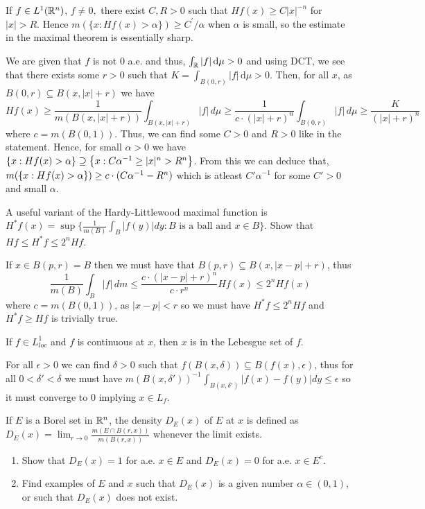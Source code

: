 \documentclass[12pt,a4paper]{article}
\begin{document}
\begin{problem}\label{prob:3-22}
If $f\in L^{1}(\mathbb{R}^{n})$, $f\ne0,$ there exist $C, R > 0$ such that $Hf(x)\ge C|x|^{-n}$ for $|x|>R$. Hence $m(\{x:Hf(x)>\alpha\})\ge C^{\prime}/\alpha$ when $\alpha$ is small, so the estimate in the maximal theorem is essentially sharp.
\end{problem}
\begin{solution}
We are given that $f$ is not $0$ a.e. and thus, $ \int_{\mathbb{R}}^{}|f|\,\mathrm{d}\mu>0$ and using DCT, we see that there exists some $r>0$ such that $K=\int_{B(0,r)}^{}|f|\,\mathrm{d}\mu>0$. 
Then, for all $x$, as $B(0,r)\subseteq B(x,|x|+r)$ we have
\[
Hf(x)\geq \frac{1}{m(B(x,|x|+r))}\int_{B(x,|x|+r)}|f|\,d\mu\geq \frac{1}{c\cdot(|x|+r)^n}\int_{B(0,r)}|f|\,d\mu\geq \frac{K}{(|x|+r)^n}
\]
where $c=m(B(0,1))$. 
Thus, we can find some $C>0$ and $R>0$ like in the statement. 
Hence, for small $\alpha>0$ we have $\qty{x:Hf(x)>\alpha}\supseteq \qty{x:C\alpha^{-1}\geq|x|^n>R^n}$. 
From this we can deduce that, $m( \qty{x:Hf(x)>\alpha})\geq c\cdot(C\alpha^{-1}-R^n)$ which is atleast $C'\alpha^{-1}$ for some $C'>0$ and small $\alpha.$
\end{solution}
\begin{problem}\label{prob:3-23}
A useful variant of the Hardy-Littlewood maximal function is $H^{*}f(x)=\sup\{\frac{1}{m(B)}\int_{B}|f(y)|dy:B \text{ is a ball and } x\in B\}$. Show that $Hf\le H^{*}f\le2^{n}Hf$.
\end{problem}
\begin{solution}
If $x\in B(p,r)=B$ then we must have that $B(p,r)\subseteq B(x,|x-p|+r)$, thus
\[
	\frac{1}{m(B)}\int_B|f|\,dm\leq \frac{c\cdot(|x-p|+r)^n}{c\cdot r^n}Hf(x)\leq 2^nHf(x)
\]
where $c=m(B(0,1))$, as $|x-p|<r$ so we must have $H^*f\leq 2^nHf$ and $H^*f\geq Hf$ is trivially true. 
\end{solution}
\begin{problem}\label{prob:3-24}
If $f\in L_{loc}^{1}$ and $f$ is continuous at $x$, then $x$ is in the Lebesgue set of $f$.
\end{problem}
\begin{solution}
	For all $\epsilon>0$ we can find $\delta>0$ such that $f(B(x,\delta)) \subseteq B(f(x),\epsilon)$, thus for all $0<\delta'<\delta$ we must have $m(B(x,\delta'))^{-1}\int_{B(x,\delta')}|f(x)-f(y)|dy\leq\epsilon$ so it must converge to $0$ implying $x\in L_f.$
\end{solution}
\begin{problem}\label{prob:3-25}
If $E$ is a Borel set in $\mathbb{R}^{n}$, the density $D_{E}(x)$ of $E$ at $x$ is defined as $D_{E}(x)=\lim_{r\rightarrow0}\frac{m(E\cap B(r,x))}{m(B(r,x))}$ whenever the limit exists.
\begin{enumerate}[label=\alph*.]
    \item Show that $D_{E}(x)=1$ for a.e. $x\in E$ and $D_{E}(x)=0$ for a.e. $x\in E^{c}$.
    \item Find examples of $E$ and $x$ such that $D_{E}(x)$ is a given number $\alpha\in(0,1)$, or such that $D_{E}(x)$ does not exist.
\end{enumerate}
\end{problem}
\end{document}
